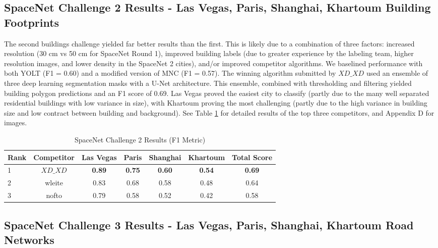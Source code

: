 \documentclass{article}
\begin{document}
\subsection{SpaceNet Challenge 2 Results - Las Vegas, Paris, Shanghai, Khartoum Building Footprints}

The second buildings challenge yielded far better results than the first.  This is likely due to a combination of three factors: increased resolution (30 cm vs 50 cm for SpaceNet Round 1), improved building labels (due to greater experience by the labeling team, higher resolution images, and lower density in the SpaceNet 2 cities), and/or improved competitor algorithms.  
We baselined performance with both YOLT (F1 = 0.60) and a modified version of MNC \cite{mnc} (F1 = 0.57).  
The winning algorithm submitted  by $XD\_XD$ \cite{xdxd} used an ensemble of three deep learning segmentation masks with a U-Net \cite{unet} architecture.  This ensemble, combined with thresholding and filtering yielded building polygon predictions and an F1 score of 0.69.
Las Vegas proved the easiest city to classify (partly due to the many well separated residential buildings with low variance in size), with Khartoum proving the most challenging (partly due to the high variance in building size and low contract between building and background).  See Table \ref{tab:sn2_res} for detailed results of the top three competitors, and Appendix D for images.

\begin{table}
  \caption{SpaceNet Challenge 2 Results (F1 Metric)}
  \label{tab:sn2_res}
  \centering
   \begin{tabular}{lcccccc}
    \toprule
    Rank & Competitor & Las Vegas & Paris & Shanghai & Khartoum & Total Score \\
    \hline
    1 & $XD\_XD$ & \bf{0.89} & \bf{0.75} & \bf{0.60} & \bf{0.54} & \bf{0.69} \\
    2 & wleite & 0.83 & 0.68 & 0.58 & 0.48 & 0.64 \\
    3 & nofto & 0.79 & 0.58 & 0.52 & 0.42 & 0.58 \\  
    \bottomrule
  \end{tabular}
\end{table}






\subsection{SpaceNet Challenge 3 Results - Las Vegas, Paris, Shanghai, Khartoum Road Networks}
\end{document}
